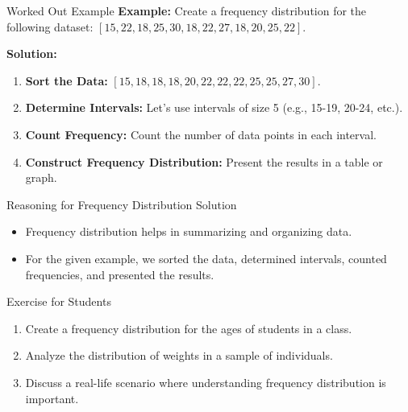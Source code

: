 \begin{frame}{Worked Out Example}
  \textbf{Example:} Create a frequency distribution for the following dataset: \([15, 22, 18, 25, 30, 18, 22, 27, 18, 20, 25, 22]\).

  \textbf{Solution:}
  \begin{enumerate}
    \item \textbf{Sort the Data:} \([15, 18, 18, 18, 20, 22, 22, 22, 25, 25, 27, 30]\).
    \item \textbf{Determine Intervals:} Let's use intervals of size 5 (e.g., 15-19, 20-24, etc.).
    \item \textbf{Count Frequency:} Count the number of data points in each interval.
    \item \textbf{Construct Frequency Distribution:} Present the results in a table or graph.
  \end{enumerate}
\end{frame}

\begin{frame}{Reasoning for Frequency Distribution Solution}
  \begin{itemize}
    \item Frequency distribution helps in summarizing and organizing data.
    \item For the given example, we sorted the data, determined intervals, counted frequencies, and presented the results.
  \end{itemize}
\end{frame}

\begin{frame}{Exercise for Students}
  \begin{enumerate}
    \item Create a frequency distribution for the ages of students in a class.
    \item Analyze the distribution of weights in a sample of individuals.
    \item Discuss a real-life scenario where understanding frequency distribution is important.
  \end{enumerate}
\end{frame}

